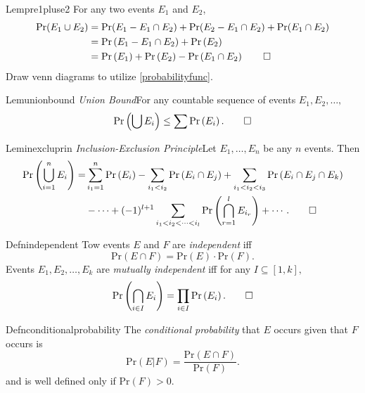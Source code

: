 \begin{reference}{Lem}{pre1pluse2}
  For any two events $E_1$ and $E_2$,
  \begin{align*}
    \mathrm{Pr}(E_1\cup E_2)
     & =\mathrm{Pr}(E_1-E_1\cap E_2)+\mathrm{Pr}(E_2-E_1\cap E_2)+\mathrm{Pr}(E_1\cap E_2)                  \\
     & =\mathrm{Pr}\left(E_1-E_1\cap E_2\right)+\mathrm{Pr}\left(E_2\right)                                 \\
     & =\mathrm{Pr}\left(E_1\right)+\mathrm{Pr}\left(E_2\right)-\mathrm{Pr}\left(E_1\cap E_2\right)\qedhere
  \end{align*}
  Draw venn diagrams to utilize \ref{probabilityfunc}.
\end{reference}

\begin{reference}{Lem}{unionbound}
  \emph{Union Bound}\quad For any countable sequence of events $E_1,E_2,\dots,$
  \[
    \mathrm{Pr}\left(\bigcup E_i\right)\leq\sum \mathrm{Pr}\left(E_i\right).\qedhere
  \]
\end{reference}

\begin{reference}{Lem}{inexcluprin}
  \emph{Inclusion-Exclusion Principle}\quad Let $E_1,\dots,E_n$ be any $n$ events. Then
  \begin{align*}
    \mathrm{Pr}\left(\bigcup_{i=1}^n E_i\right)=
     & \sum_{i_1=1}^n \mathrm{Pr}\left(E_i\right)-\sum_{i_1<i_2}\mathrm{Pr}\left(E_i\cap E_j\right)+\sum_{i_1<i_2<i_3}\mathrm{Pr}\left(E_i\cap E_j\cap E_k\right) \\
     & -\cdots+(-1)^{l+1}\sum_{i_1<i_2<\cdots<i_l}\mathrm{Pr}\left(\bigcap_{r=1}^lE_{i_r}\right)+\cdots.\qedhere
  \end{align*}
\end{reference}

\begin{reference}{Defn}{independent}
  Tow events $E$ and $F$ are \textit{independent} iff
  \[
    \mathrm{Pr}\left(E\cap F\right)=\mathrm{Pr}\left(E\right)\cdot \mathrm{Pr}\left(F\right).
  \]
  Events $E_1,E_2,\dots,E_k$ are \textit{mutually independent} iff for any $I\subseteq[1,k],$
  \[
    \mathrm{Pr}\left(\bigcap_{i\in I}E_i\right)=\prod_{i\in I}\mathrm{Pr}\left(E_i\right).\qedhere
  \]
\end{reference}

\begin{reference}{Defn}{conditionalprobability}
  The \textit{conditional probability} that $E$ occurs given that $F$ occurs is
  \[
    \mathrm{Pr}\left(E|F\right)=\displaystyle\frac{\mathrm{Pr}\left(E\cap F\right)}{\mathrm{Pr}\left(F\right)}.
  \]
  and is well defined only if $\mathrm{Pr}\left(F\right)>0$.
\end{reference}

